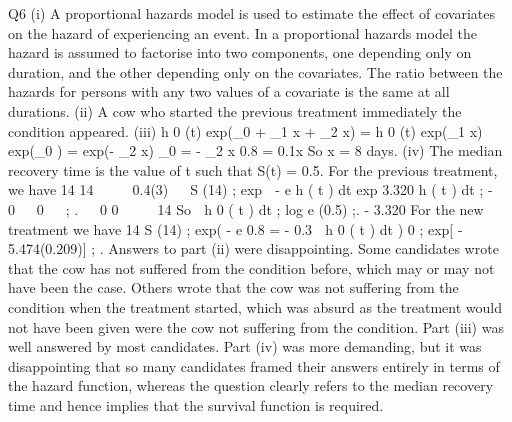 Q6
(i)
A proportional hazards model is used to estimate the effect of covariates on
the hazard of experiencing an event.
In a proportional hazards model the hazard is assumed to factorise into two
components, one depending only on duration, and the other depending only on
the covariates.
The ratio between the hazards for persons with any two values of a covariate is
the same at all durations.
(ii) A cow who started the previous treatment immediately the condition appeared.
(iii) h 0 (t) exp(\beta_0 + \beta_1 x + \beta_2 x) = h 0 (t) exp(\beta_1 x)
exp(\beta_0 ) = exp(- \beta_2 x)
\beta_0 = - \beta_2 x
0.8 = 0.1x
So x = 8 days.
(iv)
The median recovery time is the value of t such that S(t) = 0.5.
For the previous treatment, we have
14
14




0.4(3)


S (14) ;\+\; exp  - e
h
(
t
)
dt
exp
3.320
h
(
t
)
dt
;\+\;
-
 0 
 0   ;\+ .


0
0




14
So
 h 0 ( t ) dt ;\+
log e (0.5)
;\+.
- 3.320
For the new treatment we have
14
S (14) ;\+\; exp( - e 0.8 \;= - 0.3  h 0 ( t ) dt )
0
;\+\; exp[ - 5.474(0.209)] ;\+ .
Answers to part (ii) were disappointing. Some candidates wrote that the cow
has not suffered from the condition before, which may or may not have been
the case. Others wrote that the cow was not suffering from the condition
when the treatment started, which was absurd as the treatment would not
have been given were the cow not suffering from the condition. Part (iii) was
well answered by most candidates. Part (iv) was more demanding, but it was
disappointing that so many candidates framed their answers entirely in terms
of the hazard function, whereas the question clearly refers to the median
recovery time and hence implies that the survival function is required.
